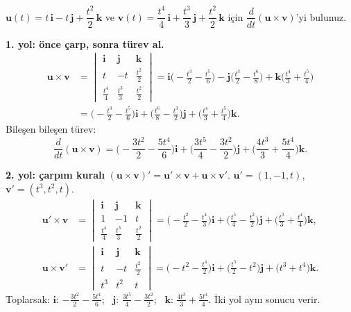 \begin{soru}
$\mathbf u(t)=t\,\mathbf i-t\,\mathbf j+\dfrac{t^2}{2}\,\mathbf k$ ve $\mathbf v(t)=\dfrac{t^4}{4}\,\mathbf i+\dfrac{t^3}{3}\,\mathbf j+\dfrac{t^2}{2}\,\mathbf k$
için $\dfrac{d}{dt}(\mathbf u\times\mathbf v)$'yi bulunuz.
\end{soru}
\begin{cevap}
\textbf{1. yol: önce çarp, sonra türev al.}
\begin{align*}
\mathbf u\times\mathbf v&=\begin{vmatrix}\mathbf i&\mathbf j&\mathbf k\\ t&-t&\frac{t^2}{2}\\ \frac{t^4}{4}&\frac{t^3}{3}&\frac{t^2}{2}\end{vmatrix}
=\mathbf i\Big(-\frac{t^3}{2}-\frac{t^5}{6}\Big)-\mathbf j\Big(\frac{t^3}{2}-\frac{t^6}{8}\Big)+\mathbf k\Big(\frac{t^4}{3}+\frac{t^5}{4}\Big)\\
&=\Big(-\frac{t^3}{2}-\frac{t^5}{6}\Big)\mathbf i+\Big(\frac{t^6}{8}-\frac{t^3}{2}\Big)\mathbf j+\Big(\frac{t^4}{3}+\frac{t^5}{4}\Big)\mathbf k .
\end{align*}
Bileşen bileşen türev:
\[ \frac{d}{dt}(\mathbf u\times\mathbf v)=\Big(-\frac{3t^2}{2}-\frac{5t^4}{6}\Big)\mathbf i+\Big(\frac{3t^5}{4}-\frac{3t^2}{2}\Big)\mathbf j+\Big(\frac{4t^3}{3}+\frac{5t^4}{4}\Big)\mathbf k . \]

\textbf{2. yol: çarpım kuralı} $(\mathbf u\times\mathbf v)'=\mathbf u'\times\mathbf v+\mathbf u\times\mathbf v'$.
$\mathbf u'=(1,-1,t)$, $\mathbf v'=(t^3,t^2,t)$.
\begin{align*}
\mathbf u'\times\mathbf v&=\begin{vmatrix}\mathbf i&\mathbf j&\mathbf k\\1&-1&t\\ \frac{t^4}{4}&\frac{t^3}{3}&\frac{t^2}{2}\end{vmatrix}
=\Big(-\frac{t^2}{2}-\frac{t^4}{3}\Big)\mathbf i+\Big(\frac{t^5}{4}-\frac{t^2}{2}\Big)\mathbf j+\Big(\frac{t^3}{3}+\frac{t^4}{4}\Big)\mathbf k,\\
\mathbf u\times\mathbf v'&=\begin{vmatrix}\mathbf i&\mathbf j&\mathbf k\\t&-t&\frac{t^2}{2}\\ t^3&t^2&t\end{vmatrix}
=\Big(-t^2-\frac{t^4}{2}\Big)\mathbf i+\Big(\frac{t^5}{2}-t^2\Big)\mathbf j+\big(t^3+t^4\big)\mathbf k .
\end{align*}
Toplarsak: $\mathbf i$: $-\frac{3t^2}{2}-\frac{5t^4}{6}$; \ $\mathbf j$: $\frac{3t^5}{4}-\frac{3t^2}{2}$; \ $\mathbf k$: $\frac{4t^3}{3}+\frac{5t^4}{4}$.
İki yol aynı sonucu verir. \checkmark
\end{cevap}

